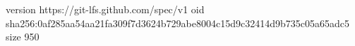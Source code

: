 version https://git-lfs.github.com/spec/v1
oid sha256:0af285aa54aa21fa309f7d3624b729abe8004c15d9c32414d9b735c05a65adc5
size 950
